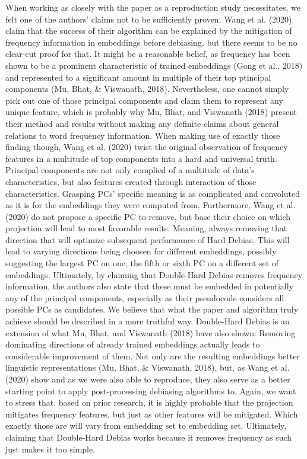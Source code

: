 \documentclass[
  english,
  man,floatsintext]{apa6}
\begin{document}
When working as closely with the paper as a reproduction study necessitates, we felt one of the authors' claims not to be sufficiently proven. Wang et al. (2020) claim that the success of their algorithm can be explained by the mitigation of frequency information in embeddings before debiasing, but there seems to be no clear-cut proof for that. It might be a reasonable belief, as frequency has been shown to be a prominent characteristic of trained embeddings (Gong et al., 2018) and represented to a significant amount in multiple of their top ptincipal components (Mu, Bhat, \& Viswanath, 2018). Nevertheless, one cannot simply pick out one of those principal components and claim them to represent any unique feature, which is probably why Mu, Bhat, and Viswanath (2018) present their method and results without making any definite claims about general relations to word frequency information. When making use of exactly those finding though, Wang et al. (2020) twist the original observation of frequency features in a multitude of top components into a hard and universal truth.
Principal components are not only complied of a multitude of data's characteristics, but also features created through interaction of those characteristics. Grasping PCs' specific meaning is as complicated and convoluted as it is for the embeddings they were computed from.
Furthermore, Wang et al. (2020) do not propose a specific PC to remove, but base their choice on which projection will lead to most favorable results. Meaning, always removing that direction that will optimize subsequent performance of Hard Debias. This will lead to varying directions being choosen for different embeddings, possibly suggesting the largest PC on one, the fifth or sixth PC on a different set of embeddings. Ultimately, by claiming that Double-Hard Debias removes frequency information, the authors also state that these must be embedded in potentially any of the principal components, especially as their pseudocode considers all possible PCs as candidates.
We believe that what the paper and algorithm truly achieve should be described in a more truthful way. Double-Hard Debias is an extension of what Mu, Bhat, and Viswanath (2018) have also shown: Removing dominating directions of already trained embeddings actually leads to considerable improvement of them. Not only are the resulting embeddings better linguistic representations (Mu, Bhat, \& Viswanath, 2018), but, as Wang et al. (2020) show and as we were also able to reproduce, they also serve as a better starting point to apply post-processing debiasing algorithms to.
Again, we want to stress that, based on prior research, it is highly probable that the projection mitigates frequency features, but just as other features will be mitigated. Which exactly those are will vary from embedding set to embedding set. Ultimately, claiming that Double-Hard Debias works because it removes frequency as such just makes it too simple.
\end{document}
